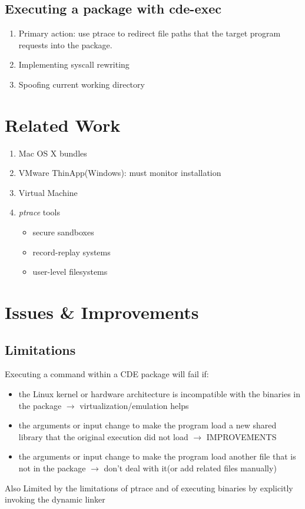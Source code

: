 \documentclass{report}
\begin{document}
\subsection{Executing a package with cde-exec}
\begin{enumerate}
\item Primary action: use ptrace to redirect file paths that the target program
requests into the package.
\item Implementing syscall rewriting
\item Spoofing current working directory
\end{enumerate}

\section{Related Work}
\begin{enumerate}
\item Mac OS X bundles
\item VMware ThinApp(Windows): must monitor \textsf{installation}
\item Virtual Machine
\item \textsl{ptrace} tools
  \begin{itemize}
  \item secure sandboxes
  \item record-replay systems
  \item user-level filesystems
  \end{itemize}
\end{enumerate}

\section{Issues \& Improvements}

\subsection{Limitations}
Executing a command within a CDE package will fail if:
\begin{itemize}
\item the Linux kernel or hardware architecture is incompatible with the
  binaries in the package $\rightarrow$ virtualization/emulation helps
\item the arguments or input change to make the program load a new shared
  library that the original execution did not load $\rightarrow$ IMPROVEMENTS
\item the arguments or input change to make the program load another file that
  is not in the package $\rightarrow$ don't deal with it(or add related files manually)
\end{itemize}
Also Limited by the limitations of ptrace and of executing binaries by explicitly invoking the dynamic linker
\end{document}
